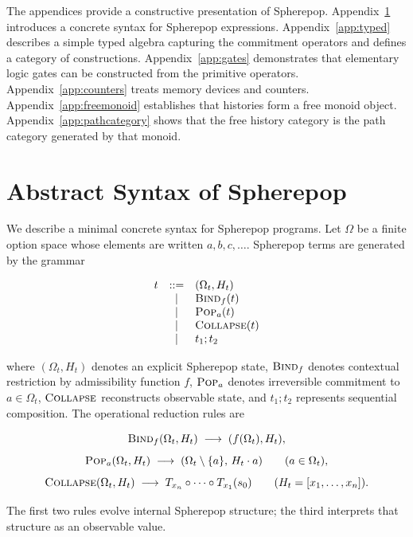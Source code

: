\documentclass[12pt]{article}
\newcommand{\Pop}{\operatorname{\textsc{Pop}}}
\newcommand{\Bind}{\operatorname{\textsc{Bind}}}
\newcommand{\Collapse}{\operatorname{\textsc{Collapse}}}
\newcommand{\Option}{\Omega}
\newcommand{\Seq}[1]{\left[#1\right]}
\newcommand{\Append}{\mathbin{\cdot}}
\begin{document}
\newpage
\appendix

The appendices provide a constructive presentation of Spherepop.
Appendix~\ref{app:syntax} introduces a concrete syntax for
Spherepop expressions. Appendix~\ref{app:typed} describes a simple
typed algebra capturing the commitment operators and defines a
category of constructions. Appendix~\ref{app:gates} demonstrates
that elementary logic gates can be constructed from the primitive
operators. Appendix~\ref{app:counters} treats memory devices and
counters. Appendix~\ref{app:freemonoid} establishes that histories
form a free monoid object. Appendix~\ref{app:pathcategory} shows
that the free history category is the path category generated by
that monoid.

\section{Abstract Syntax of Spherepop}
\label{app:syntax}

We describe a minimal concrete syntax for Spherepop programs. Let $\Option$ be a finite option space whose elements are written $a,b,c,\dots$. Spherepop terms are generated by the grammar

\[
\begin{array}{rcl}
t &::=& (\Option_t,H_t) \\
  &\mid& \Bind_f(t) \\
  &\mid& \Pop_a(t) \\
  &\mid& \Collapse(t) \\
  &\mid& t_1 ; t_2
\end{array}
\]

where $(\Option_t,H_t)$ denotes an explicit Spherepop state, $\Bind_f$ denotes contextual restriction by admissibility function $f$, $\Pop_a$ denotes irreversible commitment to $a \in \Option_t$, $\Collapse$ reconstructs observable state, and $t_1 ; t_2$ represents sequential composition. The operational reduction rules are

\[
\Bind_f(\Option_t,H_t) \;\longrightarrow\; (f(\Option_t),H_t),
\]
\[
\Pop_a(\Option_t,H_t) \;\longrightarrow\; (\Option_t \setminus \{a\},\, H_t \Append a) \qquad (a \in \Option_t),
\]
\[
\Collapse(\Option_t,H_t) \;\longrightarrow\; T_{x_n}\circ \cdots \circ T_{x_1}(s_0) \qquad (H_t = \Seq{x_1,\dots,x_n}).
\]

The first two rules evolve internal Spherepop structure; the third interprets that structure as an observable value.
\end{document}
